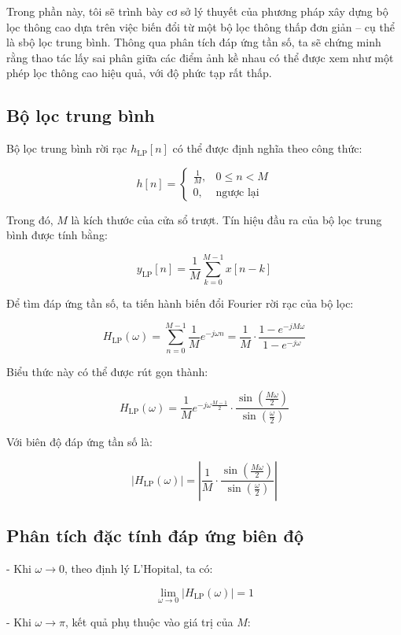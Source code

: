 Trong phần này, tôi sẽ trình bày cơ sở lý thuyết của phương pháp xây dựng bộ lọc thông cao dựa trên việc biến đổi từ một bộ lọc thông thấp đơn giản – cụ thể là sbộ lọc trung bình. 
%
Thông qua phân tích đáp ứng tần số, ta sẽ chứng minh rằng thao tác lấy sai phân giữa các điểm ảnh kề nhau có thể được xem như một phép lọc thông cao hiệu quả, với độ phức tạp rất thấp.

\subsection{Bộ lọc trung bình}

Bộ lọc trung bình rời rạc \( h_{\mathrm{LP}}[n] \) có thể được định nghĩa theo công thức:

\[
h[n] =
\begin{cases}
	\frac{1}{M}, & 0 \leq n < M \\
	0, & \text{ngược lại}
\end{cases}
\]

Trong đó, \( M \) là kích thước của cửa sổ trượt. Tín hiệu đầu ra của bộ lọc trung bình được tính bằng:

\[
y_{\mathrm{LP}}[n] = \frac{1}{M} \sum_{k=0}^{M-1} x[n-k]
\]

Để tìm đáp ứng tần số, ta tiến hành biến đổi Fourier rời rạc của bộ lọc:

\[
H_{\mathrm{LP}}(\omega) = \sum_{n=0}^{M-1} \frac{1}{M} e^{-j \omega n} = \frac{1}{M} \cdot \frac{1 - e^{-j M \omega}}{1 - e^{-j \omega}}
\]

Biểu thức này có thể được rút gọn thành:

\[
H_{\mathrm{LP}}(\omega) = \frac{1}{M} e^{-j \omega \frac{M-1}{2}} \cdot \frac{\sin\left(\frac{M \omega}{2}\right)}{\sin\left(\frac{\omega}{2}\right)}
\]

Với biên độ đáp ứng tần số là:

\[
|H_{\mathrm{LP}}(\omega)| = \left| \frac{1}{M} \cdot \frac{\sin\left( \frac{M \omega}{2} \right)}{\sin\left( \frac{\omega}{2} \right)} \right|
\]

\subsection*{Phân tích đặc tính đáp ứng biên độ}

- Khi \( \omega \to 0 \), theo định lý L'Hopital, ta có:

\[
\lim_{\omega \to 0} |H_{\mathrm{LP}}(\omega)| = 1
\]

- Khi \( \omega \to \pi \), kết quả phụ thuộc vào giá trị của \( M \):

